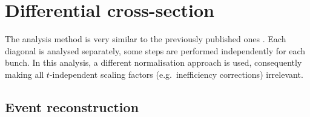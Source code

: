\section{Differential cross-section}

The analysis method is very similar to the previously published ones \cite{prl111,epl101-el}. Each diagonal is analysed
separately, some steps are performed independently for each bunch. In this analysis, a different normalisation
approach is used, consequently making all $t$-independent scaling factors (e.g.~inefficiency corrections)
irrelevant.

\subsection{Event reconstruction}

